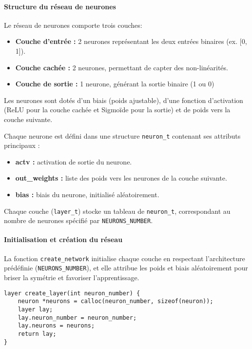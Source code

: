 \paragraph{Structure du réseau de neurones}
Le réseau de neurones comporte trois couches:

\begin{itemize}
    \item \textbf{Couche d’entrée :} 2 neurones représentant les deux entrées binaires (ex. [0, 1]).
    \item \textbf{Couche cachée :} 2 neurones, permettant de capter des non-linéarités.
    \item \textbf{Couche de sortie :} 1 neurone, générant la sortie binaire (1 ou 0)
\end{itemize}

Les neurones sont dotés d’un biais (poids ajustable), d’une fonction d’activation (ReLU pour la couche cachée et Sigmoïde pour la sortie) et de poids vers la couche suivante.

Chaque neurone est défini dans une structure \texttt{neuron\_t} contenant ses attributs principaux :

\begin{itemize}
    \item \textbf{actv :} activation de sortie du neurone.
    \item \textbf{out\_weights :} liste des poids vers les neurones de la couche suivante.
    \item \textbf{bias :} biais du neurone, initialisé aléatoirement.
\end{itemize}

Chaque couche (\texttt{layer\_t}) stocke un tableau de \texttt{neuron\_t}, correspondant au nombre de neurones spécifié par \texttt{NEURONS\_NUMBER}.

\paragraph{Initialisation et création du réseau}
La fonction \texttt{create\_network} initialise chaque couche en respectant l’architecture prédéfinie (\texttt{NEURONS\_NUMBER}), et elle attribue les poids et biais aléatoirement pour briser la symétrie et favoriser l’apprentissage.

\begin{verbatim}
layer create_layer(int neuron_number) {
    neuron *neurons = calloc(neuron_number, sizeof(neuron));
    layer lay;
    lay.neuron_number = neuron_number;
    lay.neurons = neurons;
    return lay;
}
\end{verbatim}

